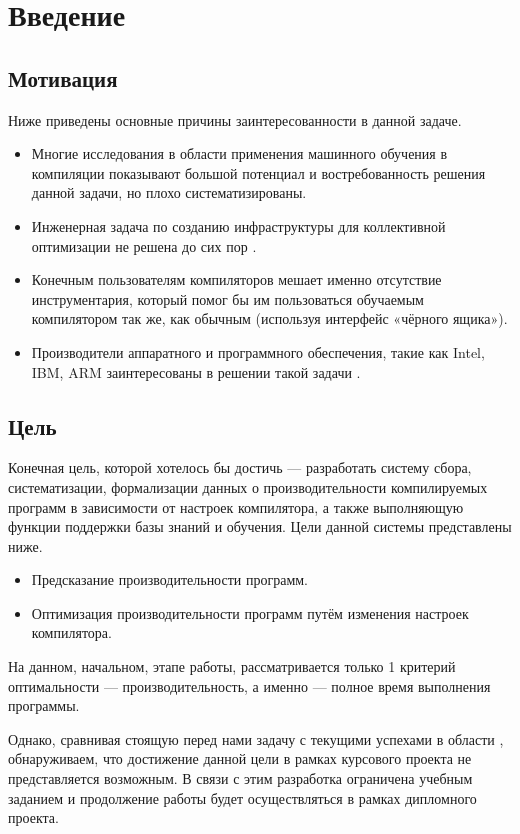 \section{Введение}


\subsection{Мотивация}
Ниже приведены основные причины заинтересованности в данной задаче.
\begin{itemize}
    \item Многие исследования в области применения машинного обучения в компиляции \cite{Dubach2009PCO,Thomson2009RTT,Stephenson2003MOI} показывают большой потенциал и востребованность решения данной задачи, но плохо систематизированы.
    \item Инженерная задача по созданию инфраструктуры для коллективной оптимизации не решена до сих пор \cite{Fursin2010COP}.
    \item Конечным пользователям компиляторов мешает именно отсутствие инструментария, который помог бы им пользоваться обучаемым компилятором так же, как обычным (используя интерфейс «чёрного ящика»).
    \item Производители аппаратного и программного обеспечения, такие как Intel, IBM, ARM заинтересованы в решении такой задачи \cite{IntelExascale}.
\end{itemize}


\subsection{Цель}
Конечная цель, которой хотелось бы достичь --- разработать систему сбора, систематизации, формализации данных о производительности компилируемых программ в зависимости от настроек компилятора, а также выполняющую функции поддержки базы знаний и обучения. Цели данной системы представлены ниже.
\begin{itemize}
    \item Предсказание производительности программ.
    \item Оптимизация производительности программ путём изменения настроек компилятора.
\end{itemize}

На данном, начальном, этапе работы, рассматривается только 1 критерий оптимальности --- производительность, а именно --- полное время выполнения программы.

Однако, сравнивая стоящую перед нами задачу с текущими успехами в области \cite{Fursin2010COP}, обнаруживаем, что достижение данной цели в рамках курсового проекта не представляется возможным. В связи с этим разработка ограничена учебным заданием и продолжение работы будет осуществляться в рамках дипломного проекта.

